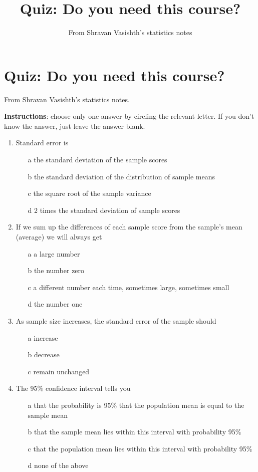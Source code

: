 \documentclass[a4]{article}
\title{Quiz: Do you need this course?}
\author{From Shravan Vasishth's statistics notes}
\begin{document}
\section{Quiz: Do you need this course?}
From Shravan Vasishth's statistics notes.

\textbf{Instructions}: choose only one answer by circling the relevant letter. If you don't know the answer, just leave the answer blank. 

\begin{enumerate}
\item Standard error is

\begin{enumerate}
\item[a] the standard deviation of the sample scores
\item[b] the standard deviation of the distribution of sample means
\item[c] the square root of the sample variance
\item[d] 2 times the standard deviation of sample scores
\end{enumerate}

\item
If we sum up the differences of each sample score from the sample's mean (average) we will always get

\begin{enumerate}
\item[a] a large number
\item[b] the number zero
\item[c] a different number each time, sometimes large, sometimes small
\item[d] the number one
\end{enumerate}

\item As sample size increases, the standard error of the sample should

\begin{enumerate}
\item[a]
increase
\item[b]
decrease
\item[c]
remain unchanged
\end{enumerate}

\item
The 95\% confidence interval tells you

\begin{enumerate}
\item[a]
that the probability is 95\% that the population mean is equal to the sample mean
\item[b]
that the sample mean lies within this interval with probability 95\%
\item[c]
that the population mean lies within this interval with probability 95\%
\item[d] 
none of the above
\end{enumerate}


\end{enumerate}
\end{document}
